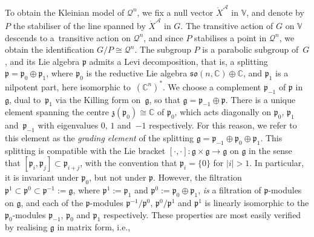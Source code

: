 \documentclass[pdftex]{sigma}
\numberwithin{equation}{section}
\newcommand{\mc} [1]{\mathcal{#1}}
\newcommand{\mr}[1] {\mathring{#1}}
\newcommand{\so} {\mathfrak{so}}
\newcommand{\g} {\mathfrak{g}}
\newcommand{\mfp} {\mathfrak{p}}
\newcommand{\mfz} {\mathfrak{z}}
\newcommand{\C} {\mathbb{C}}
\newcommand{\V} {\mathbb{V}}
\begin{document}
To obtain the Kleinian model of $\mc{Q}^n$, we f\/ix a null vector $\mr{X}^\mc{A}$ in $\V$, and denote by $P$ the stabiliser of the line spanned by $\mr{X}^\mc{A}$ in $G$. The transitive action of $G$ on $\V$ descends to a~transitive action on $\mc{Q}^n$, and since $P$ stabilises a point in $\mc{Q}^n$, we obtain the identif\/ication $G/P \cong \mc{Q}^n$. The subgroup $P$ is a parabolic subgroup of~$G$, and its Lie algebra $\mfp$ admits a Levi decomposition, that is, a splitting $\mfp = \mfp_0 \oplus \mfp_1$, where $\mfp_0$ is the reductive Lie algebra $\so(n,\C) \oplus \C$, and $\mfp_1$ is a nilpotent part, here isomorphic to~$(\C^n)^*$. We choose a complement $\mfp_{-1}$ of $\mfp$ in~$\g$, dual to~$\mfp_1$ via the Killing form on~$\g$, so that $\g = \mfp_{-1} \oplus \mfp$. There is a unique element spanning the centre $\mfz(\mfp_0) \cong \C$ of $\mfp_0$, which acts diagonally on $\mfp_0$, $\mfp_1$ and~$\mfp_{-1}$ with eigenvalues $0$, $1$ and~$-1$ respectively. For this reason, we refer to this element as the \emph{grading element} of the splitting $\g = \mfp_{-1} \oplus \mfp_0 \oplus \mfp_1$. This splitting is compatible with the Lie bracket $[ \cdot , \cdot ] \colon \g \times \g \rightarrow \g$ on $\g$ in the sense that $[ \mfp_i , \mfp_j ] \subset \mfp_{i+j}$, with the convention that $\mfp_i = \{ 0 \}$ for $|i|>1$. In particular, it is invariant under $\mfp_0$, but not under $\mfp$. However, the f\/iltration $\mfp^1 \subset \mfp^0 \subset \mfp^{-1} := \g$, where $\mfp^1 := \mfp_1$ and $\mfp^0 := \mfp_0 \oplus \mfp_1$, \emph{is} a f\/iltration of $\mfp$-modules on $\g$, and each of the $\mfp$-modules $\mfp^{-1}/\mfp^0$, $\mfp^0/\mfp^1$ and $\mfp^1$ is linearly isomorphic to the $\mfp_0$-modules $\mfp_{-1}$, $\mfp_0$ and $\mfp_1$ respectively. These properties are most easily verif\/ied by realising $\g$ in matrix form, i.e.,
\end{document}

